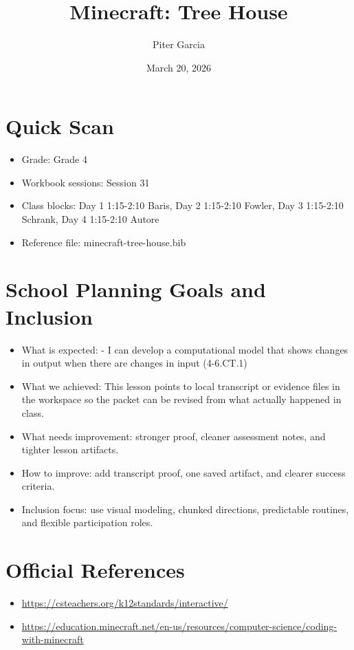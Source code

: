 \documentclass[11pt]{article}
\title{Minecraft: Tree House}
\author{Piter Garcia}
\date{March 20, 2026}
\begin{document}
    \maketitle
    \section*{Quick Scan}
    \begin{itemize}[leftmargin=*]
    \item Grade: Grade 4
    \item Workbook sessions: Session 31
    \item Class blocks: Day 1 1:15-2:10 Baris, Day 2 1:15-2:10 Fowler, Day 3 1:15-2:10 Schrank, Day 4 1:15-2:10 Autore
    \item Reference file: minecraft-tree-house.bib
    \end{itemize}
    \section*{School Planning Goals and Inclusion}
    \begin{itemize}[leftmargin=*]
    \item What is expected: - I can develop a computational model that shows changes in output when there are changes in input (4-6.CT.1)
    \item What we achieved: This lesson points to local transcript or evidence files in the workspace so the packet can be revised from what actually happened in class.
    \item What needs improvement: stronger proof, cleaner assessment notes, and tighter lesson artifacts.
    \item How to improve: add transcript proof, one saved artifact, and clearer success criteria.
    \item Inclusion focus: use visual modeling, chunked directions, predictable routines, and flexible participation roles.
    \end{itemize}
    \section*{Official References}
    \begin{itemize}[leftmargin=*]
    \item \url{https://csteachers.org/k12standards/interactive/}
\item \url{https://education.minecraft.net/en-us/resources/computer-science/coding-with-minecraft}

    \end{itemize}
    
\end{document}
